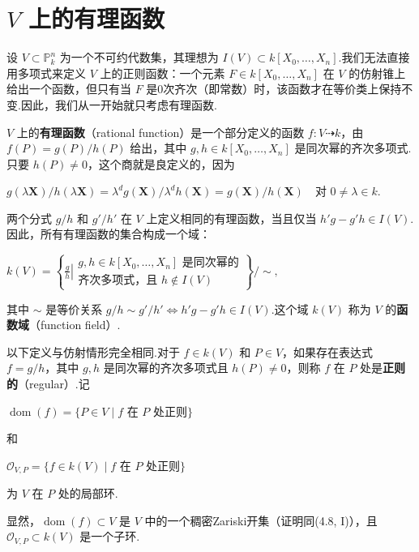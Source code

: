 \section{\(V\) 上的有理函数}

设 \(V \subset {\mathbb{P}}_k^n\) 为一个不可约代数集，其理想为 \(I(V) \subset k[X_0, \ldots, X_n]\).我们无法直接用多项式来定义 \(V\) 上的正则函数：一个元素 \(F \in k[X_0, \ldots, X_n]\) 在 \(V\) 的仿射锥上给出一个函数，但只有当 \(F\) 是0次齐次（即常数）时，该函数才在等价类上保持不变.因此，我们从一开始就只考虑有理函数.

\begin{definition}
\(V\) 上的\textbf{有理函数}（rational function）是一个部分定义的函数 \(f : V \dashrightarrow k\)，由 \(f(P) = g(P)/h(P)\) 给出，其中 \(g, h \in k[X_0, \ldots, X_n]\) 是同次幂的齐次多项式.只要 \(h(P) \neq 0\)，这个商就是良定义的，因为

\(
g(\lambda\mathbf{X})/h(\lambda\mathbf{X}) = \lambda^d g(\mathbf{X})/\lambda^d h(\mathbf{X}) = g(\mathbf{X})/h(\mathbf{X}) \quad \text{对 } 0 \neq \lambda \in k.
\)
\end{definition}

两个分式 \(g/h\) 和 \(g'/h'\) 在 \(V\) 上定义相同的有理函数，当且仅当 \(h'g - g'h \in I(V)\).因此，所有有理函数的集合构成一个域：

\(
k(V) = \left\{ \left. \frac{g}{h} \right| \begin{array}{l} g,h \in k[X_0, \ldots, X_n] \text{ 是同次幂的} \\ \text{齐次多项式，且 } h \notin I(V) \end{array} \right\} / \sim,
\)

其中 \(\sim\) 是等价关系 \(g/h \sim g'/h' \Leftrightarrow h'g - g'h \in I(V)\).这个域 \(k(V)\) 称为 \(V\) 的\textbf{函数域}（function field）.

以下定义与仿射情形完全相同.对于 \(f \in k(V)\) 和 \(P \in V\)，如果存在表达式 \(f = g/h\)，其中 \(g,h\) 是同次幂的齐次多项式且 \(h(P) \neq 0\)，则称 \(f\) 在 \(P\) 处是\textbf{正则的}（regular）.记

\(
\operatorname{dom}(f) = \{ P \in V \mid f \text{ 在 } P \text{ 处正则} \}
\)

和

\(
\mathcal{O}_{V,P} = \{ f \in k(V) \mid f \text{ 在 } P \text{ 处正则} \}
\)

为 \(V\) 在 \(P\) 处的局部环.

显然，\(\operatorname{dom}(f) \subset V\) 是 \(V\) 中的一个稠密Zariski开集（证明同(4.8, I)），且 \(\mathcal{O}_{V,P} \subset k(V)\) 是一个子环.

